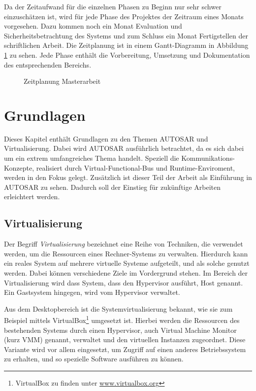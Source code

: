 \documentclass[
  a4paper,					    %
  twoside,
  DIV=calc,     				%
  bibliography=totoc,
  cleardoublepage=empty,
  ngerman,     					%
  final       					%
]{scrbook}
\begin{document}
Da der Zeitaufwand für die einzelnen Phasen zu Beginn nur sehr schwer einzuschätzen ist, wird für jede Phase des Projektes der Zeitraum eines Monats vorgesehen. Dazu kommen noch ein Monat Evaluation und Sicherheitsbetrachtung des Systems und zum Schluss ein Monat Fertigstellen der schriftlichen Arbeit. Die Zeitplanung ist in einem Gantt-Diagramm in Abbildung \ref{fig:gantt} zu sehen. Jede Phase enthält die Vorbereitung, Umsetzung und Dokumentation des entsprechenden Bereichs.

\begin{figure}[ht]
    \centering
    
    \caption{Zeitplanung Masterarbeit}
    \label{fig:gantt}
\end{figure}


\chapter{Grundlagen}
\label{sec:Grundlagen}
Dieses Kapitel enthält Grundlagen zu den Themen AUTOSAR und Virtualisierung. Dabei wird AUTOSAR ausführlich betrachtet, da es sich dabei um ein extrem umfangreiches Thema handelt. Speziell die Kommunikations-Konzepte, realisiert durch Virtual-Functional-Bus und Runtime-Enviroment, werden in den Fokus gelegt. Zusätzlich ist dieser Teil der Arbeit als Einführung in AUTOSAR zu sehen. Dadurch soll der Einstieg für zukünftige Arbeiten erleichtert werden.


\section{Virtualisierung}
\label{sec:Virtualisierung}
Der Begriff \emph{Virtualisierung} bezeichnet eine Reihe von Techniken, die verwendet werden, um die Ressourcen eines Rechner-Systems zu verwalten. Hierdurch kann ein reales System auf mehrere virtuelle Systeme aufgeteilt, und als solche genutzt werden. Dabei können verschiedene Ziele im Vordergrund stehen. Im Bereich der Virtualisierung wird dass System, dass den Hypervisor ausführt, Host genannt. Ein Gastsystem hingegen, wird vom Hypervisor verwaltet.

Aus dem Desktopbereich ist die Systemvirtualisierung bekannt, wie sie zum Beispiel mittels VirtualBox\footnote{VirtualBox zu finden unter \url{www.virtualbox.org}} umgesetzt ist. Hierbei werden die Ressourcen des bestehenden Systems durch einen Hypervisor, auch Virtual Machine Monitor (kurz VMM) genannt, verwaltet und den virtuellen Instanzen zugeordnet. Diese Variante wird vor allem eingesetzt, um Zugriff auf einen anderes Betriebssystem zu erhalten, und so spezielle Software ausführen zu können.
\end{document}

